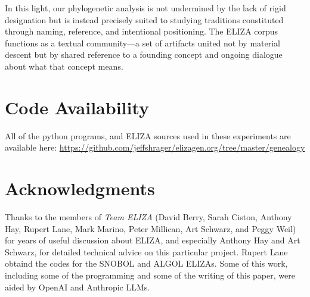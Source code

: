 \documentclass{article}
\begin{document}
In this light, our phylogenetic analysis is not undermined by the lack of rigid designation but is instead precisely suited to studying traditions constituted through naming, reference, and intentional positioning. The ELIZA corpus functions as a textual community—a set of artifacts united not by material descent but by shared reference to a founding concept and ongoing dialogue about what that concept means.

\section*{Code Availability}

All of the python programs, and ELIZA sources used in these experiments are available here: \url{https://github.com/jeffshrager/elizagen.org/tree/master/genealogy}

\section*{Acknowledgments}

Thanks to the members of \textit{Team ELIZA} (David Berry, Sarah Ciston, Anthony Hay, Rupert Lane, Mark Marino, Peter Millican, Art Schwarz, and Peggy Weil) for years of useful discussion about ELIZA, and especially Anthony Hay and Art Schwarz, for detailed technical advice on this particular project. Rupert Lane obtaind the codes for the SNOBOL and ALGOL ELIZAs.
Some of this work, including some of the programming and some of the writing of this paper, were aided by OpenAI and Anthropic LLMs.



\end{document}

